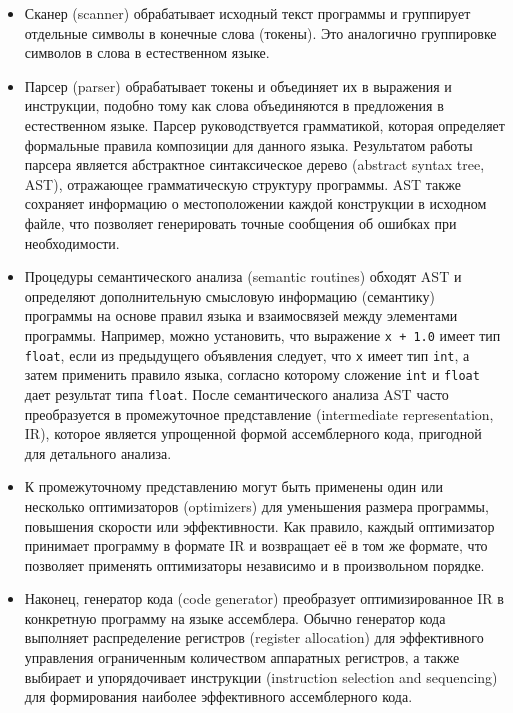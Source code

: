 \begin{itemize}
    \item Сканер (scanner) обрабатывает исходный текст программы и группирует отдельные символы в конечные слова (токены).
          Это аналогично группировке символов в слова в естественном языке.
    \item Парсер (parser) обрабатывает токены и объединяет их в выражения и инструкции, подобно тому как слова объединяются в предложения в естественном языке.
          Парсер руководствуется грамматикой, которая определяет формальные правила композиции для данного языка.
          Результатом работы парсера является абстрактное синтаксическое дерево (abstract syntax tree, AST), отражающее грамматическую структуру программы.
          AST также сохраняет информацию о местоположении каждой конструкции в исходном файле, что позволяет генерировать точные сообщения об ошибках при необходимости.
    \item Процедуры семантического анализа (semantic routines) обходят AST и определяют дополнительную смысловую информацию (семантику) программы на основе правил языка и взаимосвязей между элементами программы.
          Например, можно установить, что выражение \verb|x + 1.0| имеет тип \verb|float|, если из предыдущего объявления следует, что \verb|x| имеет тип \verb|int|, а затем применить правило языка, согласно которому сложение \verb|int| и \verb|float| дает результат типа \verb|float|.
          После семантического анализа AST часто преобразуется в промежуточное представление (intermediate representation, IR), которое является упрощенной формой ассемблерного кода, пригодной для детального анализа.
    \item К промежуточному представлению могут быть применены один или несколько оптимизаторов (optimizers) для уменьшения размера программы, повышения скорости или эффективности.
          Как правило, каждый оптимизатор принимает программу в формате IR и возвращает её в том же формате, что позволяет применять оптимизаторы независимо и в произвольном порядке.
    \item Наконец, генератор кода (code generator) преобразует оптимизированное IR в конкретную программу на языке ассемблера.
          Обычно генератор кода выполняет распределение регистров (register allocation) для эффективного управления ограниченным количеством аппаратных регистров, а также выбирает и упорядочивает инструкции (instruction selection and sequencing) для формирования наиболее эффективного ассемблерного кода.
\end{itemize}


